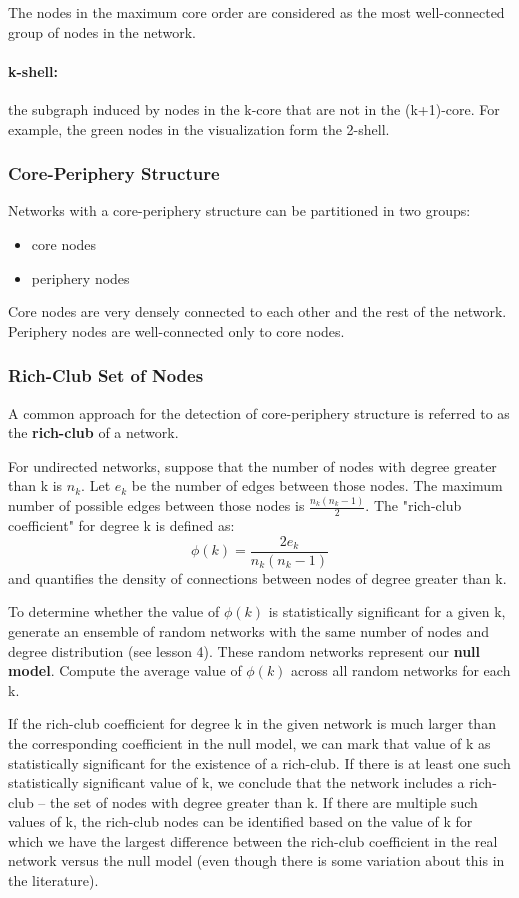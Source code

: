 \documentclass[11pt]{scrartcl} %
\begin{document}
The nodes in the maximum core order are considered as the most well-connected group of nodes in the network.

\paragraph{k-shell:} the subgraph induced by nodes in the k-core that are not in the (k+1)-core. For example, the green nodes in the visualization form the 2-shell.

\subsubsection{Core-Periphery Structure}
Networks with a core-periphery structure can be partitioned in two groups: 
\begin{itemize}
	\item core nodes 
	\item periphery nodes
\end{itemize}

Core nodes are very densely connected to each other and the rest of the network. Periphery nodes are well-connected only to core nodes.

\subsubsection{Rich-Club Set of Nodes}
A common approach for the detection of core-periphery structure is referred to as the \textbf{rich-club} of a network.

For undirected networks, suppose that the number of nodes with degree greater than k is $n_k$. Let $e_k$ be the number of edges between those nodes. The maximum number of possible edges between those nodes is $\frac{n_k(n_k - 1)}{2}$. The "rich-club coefficient" for degree k is defined as:
\[ \phi (k) = \frac{2e_k}{n_k(n_k - 1)} \]
and quantifies the density of connections between nodes of degree greater than k.

To determine whether the value of $\phi (k)$ is statistically significant for a given k, generate an ensemble of random networks with the same number of nodes and degree distribution (see lesson 4). These random networks represent our \textbf{null model}. Compute the average value of $\phi (k)$ across all random networks for each k.

If the rich-club coefficient for degree k in the given network is much larger than the corresponding coefficient in the null model, we can mark that value of k as statistically significant for the existence of a rich-club. If there is at least one such statistically significant value of k, we conclude that the network includes a rich-club -- the set of nodes with degree greater than k. If there are multiple such values of k, the rich-club nodes can be identified based on the value of k for which we have the largest difference between the rich-club coefficient in the real network versus the null model (even though there is some variation about this in the literature).
\end{document}
